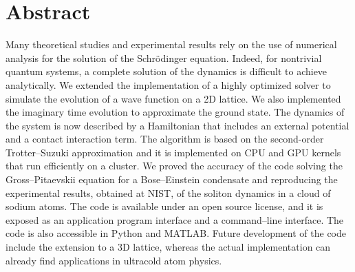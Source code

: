 \thispagestyle{empty}
\chapter*{Abstract}
Many theoretical studies and experimental results rely on the use of numerical analysis for the solution of the Schr\"odinger equation. Indeed, for nontrivial quantum systems, a complete solution of the dynamics is difficult to achieve analytically. We extended the implementation of a highly optimized solver to simulate the evolution of a wave function on a 2D lattice. We also implemented the imaginary time evolution to approximate the ground state. The dynamics of the system is now described by a Hamiltonian that includes an external potential and a contact interaction term. The algorithm is based on the second-order Trotter--Suzuki approximation and it is implemented on CPU and GPU kernels that run efficiently on a cluster. We proved the accuracy of the code solving the Gross--Pitaevskii equation for a Bose--Einstein condensate and reproducing the experimental results, obtained at NIST, of the soliton dynamics in a cloud of sodium atoms. The code is available under an open source license, and it is exposed as an application program interface and a command--line interface. The code is also accessible in Python and MATLAB. Future development of the code include the extension to a 3D lattice, whereas the actual implementation can already find applications in ultracold atom physics.